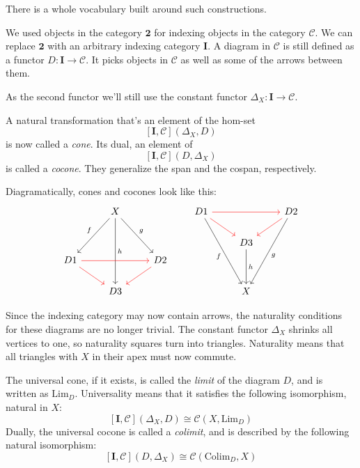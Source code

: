 \documentclass[DaoFP]{subfiles}
\begin{document}
There is a whole vocabulary built around such constructions. 

We used objects in the category $\mathbf{2}$ for indexing objects in the category $\mathcal{C}$. We can replace $\mathbf{2}$ with an arbitrary indexing category $\mathbf{I}$. A diagram in $\mathcal{C}$ is still defined as a functor $D \colon \mathbf{I} \to \mathcal{C}$. It picks objects in $\mathcal{C}$ as well as some of the arrows between them.

As the second functor we'll still use the constant functor $\Delta_X \colon \mathbf{I} \to \mathcal{C}$.

A  natural transformation that's an element of the hom-set
\[ [\mathbf{I}, \mathcal{C}](\Delta_X, D)  \]
is now called a \emph{cone}. Its dual, an element of
\[ [\mathbf{I}, \mathcal{C}](D, \Delta_X)  \]
is called a \emph{cocone}. They generalize the span and the cospan, respectively.

Diagramatically, cones and cocones look like this:
\[
 \begin{tikzcd}
  & X
\arrow[ddr, "g"]
 \arrow[ddl, "f"']
 \arrow[ddd, "h"]
 \\
\\
D 1 
\arrow[rr, red]
\arrow[rd, red]
&& D 2
\arrow[dl, red]
\\
& D 3
 \end{tikzcd}
 \qquad
\begin{tikzcd}
 D 1
 \arrow[rr, red]
 \arrow[dr, red]
 \arrow[dddr, "f"']
 && D 2
\arrow[dl, red]
 \arrow[dddl, "g"]
 \\
 & D 3
 \arrow[dd, "h"]
 \\
 \\
 & X
 \end{tikzcd}
 \]

Since the indexing category may now contain arrows, the naturality conditions for these diagrams are no longer trivial. The constant functor $\Delta_X$ shrinks all vertices to one, so naturality squares turn into triangles. Naturality means that all triangles with $X$ in their apex must now commute. 

The universal cone, if it exists, is called the \emph{limit} of the diagram $D$, and is written as $\text{Lim}_D$. Universality means that it satisfies the following isomorphism, natural in $X$:
\[ [\mathbf{I}, \mathcal{C}](\Delta_X, D)  \cong \mathcal{C}(X, \text{Lim}_D) \]
Dually, the universal cocone is called a \emph{colimit}, and is described by the following natural isomorphism:
\[ [\mathbf{I}, \mathcal{C}](D, \Delta_X)  \cong \mathcal{C}( \text{Colim}_D, X) \]
\end{document}
